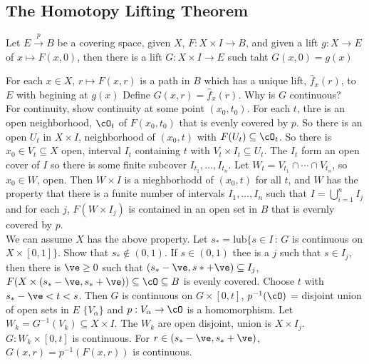 
\subsection{The Homotopy Lifting Theorem}

\begin{theorem}
    Let $E \stackrel{p}{\to} B$ be a covering space, given $X$, $F: X \times I \to B$, and given a lift $g: X \to E$ of $x \mapsto F(x,0)$, then there is a lift $G: X \times I \to E$ such taht $G(x,0)=g(x)$ 
\end{theorem}

\begin{pf}
    For each $x \in X$, $r \mapsto F(x,r)$ is a path in $B$ which has a unique lift, $\hat{f}_x(r)$, to $E$ with begining at $g(x)$ 
    Define $G(x,r) = \hat{f}_x(r)$. Why is $G$ continuous? \\
    For continuity, show continuity at some point $(x_0, t_0)$. For each $t$, thre is an open neighborhood, $\cO_t$ of $F(x_0, t_0)$ that is evenly covered by $p$. So there is an open $U_t$ in $X \times I$, neighborhood of $(x_0, t)$ with $F(U_t) \subseteq \cO_t$. So there is $x_0 \in V_t \subseteq X$ open, interval $I_t$ containing $t$ with $V_t \times I_t \subseteq U_t$. The $I_t$ form an open cover of $I$ so there is some finite subcover $I_{t_1}, \ldots, I_{t_n}$. Let $W_t = V_{t_1} \cap \cdots \cap V_{t_n}$, so $x_0 \in W$, open. Then $W \times I$ is a nieghborhodd of $(x_0, t)$ for all $t$, and $W$ has the property that there is a funite number of intervals $I_1, \ldots, I_n$ such that $I = \bigcup_{i=1}^n I_j$ and for each $j$, $F(W \times I_j)$ is contained in an open set in $B$ that is evernly covered by $p$. \\ 
    We can assume $X$ has the above property. Let $s_* = \text{lub}\{ s \in I \, : \, G$ is continuous on $X \times [0,1]\}$. Show that $s_* \not\in (0,1)$. If $s \in (0,1)$ thee is a $j$ such that $s \in I_j$, then there is $\ve \ge 0$ such that $(s_* - \ve, s* + \ve) \subseteq I_j$, $F(X \times (s_* - \ve, s_* + \ve)) \subseteq \cO \subseteq B$ is evenly covered. Choose $t$ with $s_* - \ve < t < s$. Then $G$ is continuous on $G \times [0,t]$, $p^{-1}(\cO)$ = disjoint union of open sets in $E$ $\{V_\alpha\}$ and $p: V_{\alpha} \to \cO$ is a homomorphism. Let $W_k = G^{-1}(V_k) \subseteq X \times I$. The $W_k$ are open disjoint, union is $X \times I_j$. $G: W_k \times [0,t]$ is continuous. For $r \in (s_* - \ve, s_* + \ve)$, $G(x,r) = p^{-1}(F(x,r))$ is continuous. 
\end{pf}